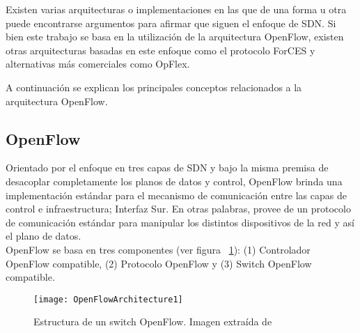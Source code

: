 Existen varias arquitecturas o implementaciones en las que de una forma u otra puede encontrarse argumentos para afirmar que siguen el enfoque de SDN. Si bien este trabajo se basa en la utilización de la arquitectura OpenFlow, existen otras arquitecturas basadas en este enfoque como el protocolo ForCES y alternativas m\'as comerciales como OpFlex.

A continuaci\'on se explican los principales conceptos relacionados a la arquitectura OpenFlow.

\subsection{OpenFlow}

Orientado por el enfoque en tres capas de SDN y bajo la misma premisa de desacoplar completamente los planos de datos y control, OpenFlow\cite{mckeown2008openflow} brinda una implementaci\'on estándar para el mecanismo de comunicación entre las capas de control e infraestructura; Interfaz Sur. En otras palabras, provee de un protocolo de comunicación estándar para manipular los distintos dispositivos de la red y así el plano de datos.\\ 

OpenFlow se basa en tres componentes (ver figura ~\ref{fig:OpenFlowArch}): (1) Controlador OpenFlow compatible, (2) Protocolo OpenFlow y (3) Switch OpenFlow compatible.

  


\begin{figure}[htbp!] 
\centering    
\texttt{[image: OpenFlowArchitecture1]}
\caption[Estructura de un switch OpenFlow]{Estructura de un switch OpenFlow. Imagen extraída de \cite{mckeown2008openflow}}
\label{fig:OpenFlowArch}
\end{figure}

